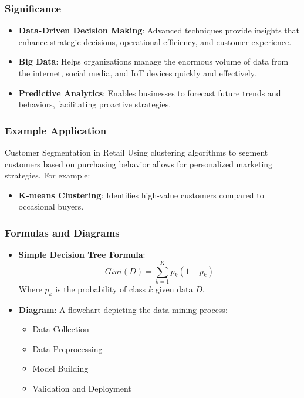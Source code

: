 \documentclass{beamer}
\begin{document}
\begin{frame}[fragile]
    \frametitle{Significance}
    \begin{itemize}
        \item \textbf{Data-Driven Decision Making}: Advanced techniques provide insights that enhance strategic decisions, operational efficiency, and customer experience.
        
        \item \textbf{Big Data}: Helps organizations manage the enormous volume of data from the internet, social media, and IoT devices quickly and effectively.
        
        \item \textbf{Predictive Analytics}: Enables businesses to forecast future trends and behaviors, facilitating proactive strategies.
    \end{itemize}
\end{frame}

\begin{frame}[fragile]
    \frametitle{Example Application}
    \begin{block}{Customer Segmentation in Retail}
        Using clustering algorithms to segment customers based on purchasing behavior allows for personalized marketing strategies. For example:
        \begin{itemize}
            \item \textbf{K-means Clustering}: Identifies high-value customers compared to occasional buyers.
        \end{itemize}
    \end{block}
\end{frame}

\begin{frame}[fragile]
    \frametitle{Formulas and Diagrams}
    \begin{itemize}
        \item \textbf{Simple Decision Tree Formula}:
        \begin{equation}
            Gini(D) = \sum_{k=1}^{K} p_k(1 - p_k)
        \end{equation}
        Where \( p_k \) is the probability of class \( k \) given data \( D \).
        
        \item \textbf{Diagram}: A flowchart depicting the data mining process: 
        \begin{itemize}
            \item Data Collection
            \item Data Preprocessing
            \item Model Building
            \item Validation and Deployment
        \end{itemize}
    \end{itemize}
\end{frame}
\end{document}
